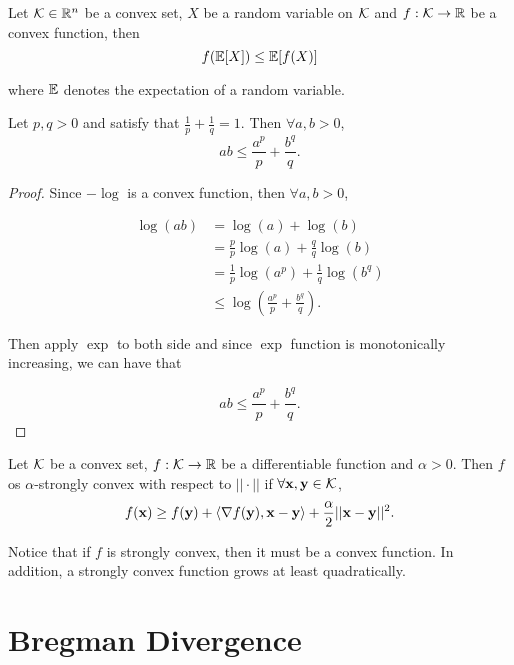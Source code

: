 \documentclass[../main.tex]{subfiles}
\begin{document}
\begin{theorem}
	Let $\mathcal{K} \in \mathbb{R}^n$ be a convex set, $X$ be a random variable on $\mathcal{K}$ and $f:\mathcal{K} \to \mathbb{R}$ be a convex function, then
	\begin{equation}
		f(\mathbb{E}[X]) \leq \mathbb{E}[f(X)]
	\end{equation}
	
	where $\mathbb{E}$ denotes the expectation of a random variable.
\end{theorem}

\begin{theorem}
	Let $p, q > 0$ and satisfy that $\frac{1}{p} + \frac{1}{q} = 1$. Then $\forall a, b > 0$,
	\begin{equation}
		ab \leq \frac{a^p}{p} + \frac{b^q}{q}.
	\end{equation}
\end{theorem}

\begin{proof}
	Since $-\log$ is a convex function, then $\forall a, b > 0$,
	
	\begin{equation*}
		\begin{aligned}
			\log(ab) & =\log(a) + \log(b) \\
					 & = \frac{p}{p} \log (a) + \frac{q}{q}\log (b)\\
					 & = \frac{1}{p} \log(a^p) + \frac{1}{q} \log(b^q) \\
					 & \leq \log (\frac{a^p}{p} + \frac{b^q}{q} ).
		\end{aligned}
	\end{equation*}
	
	Then apply $\exp$ to both side and since $\exp$ function is monotonically increasing, we can have that 
	
	\begin{equation*}
	ab \leq \frac{a^p}{p} + \frac{b^q}{q}.
	\end{equation*}
\end{proof}


\begin{definition}
	Let $\mathcal{K}$ be a convex set, $f: \mathcal{K} \to \mathbb{R}$ be a differentiable function and $\alpha > 0$. Then $f$ os $\alpha$-strongly convex with respect to $||\cdot||$ if $\forall \mathbf{x}, \mathbf{y} \in \mathcal{K}$, 
	\begin{equation}
		f(\mathbf{x}) \geq f(\mathbf{y}) + \langle \nabla f(\mathbf{y}), \mathbf{x} - \mathbf{y} \rangle + \frac{\alpha}{2} ||\mathbf{x} - \mathbf{y}||^2.
	\end{equation}
\end{definition}

Notice that if $f$ is strongly convex, then it must be a convex function. In addition, a strongly convex function grows at least quadratically. 

\begin{claim}
	
\end{claim}
\section{Bregman Divergence}
\end{document}
